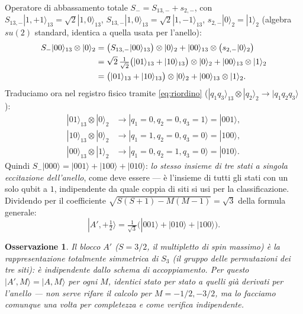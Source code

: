 \documentclass[11pt,a4paper]{article}
\newtheorem{osservazione}{Osservazione}
\begin{document}
Operatore di abbassamento totale $S_-=S_{13,-}+s_{2,-}$, con
$S_{13,-}|1,{+}1\rangle_{13}=\sqrt2|1,0\rangle_{13}$,
$S_{13,-}|1,0\rangle_{13}=\sqrt2|1,{-}1\rangle_{13}$, $s_{2,-}|0\rangle_2=|1\rangle_2$
(algebra $su(2)$ standard, identica a quella usata per l'anello):
\begin{align}
S_-|00\rangle_{13}\otimes|0\rangle_2
&= \big(S_{13,-}|00\rangle_{13}\big)\otimes|0\rangle_2 + |00\rangle_{13}\otimes\big(s_{2,-}|0\rangle_2\big)\notag\\
&= \sqrt2\,\tfrac1{\sqrt2}\big(|01\rangle_{13}+|10\rangle_{13}\big)\otimes|0\rangle_2 + |00\rangle_{13}\otimes|1\rangle_2\notag\\
&= \big(|01\rangle_{13}+|10\rangle_{13}\big)\otimes|0\rangle_2 + |00\rangle_{13}\otimes|1\rangle_2 .
\end{align}
Traduciamo ora nel registro fisico tramite \eqref{eq:riordino} ($|q_1q_3\rangle_{13}\otimes|q_2\rangle_2\to|q_1q_2q_3\rangle$):
\begin{align}
|01\rangle_{13}\otimes|0\rangle_2 &\to |q_1{=}0,q_2{=}0,q_3{=}1\rangle = |001\rangle,\\
|10\rangle_{13}\otimes|0\rangle_2 &\to |q_1{=}1,q_2{=}0,q_3{=}0\rangle = |100\rangle,\\
|00\rangle_{13}\otimes|1\rangle_2 &\to |q_1{=}0,q_2{=}1,q_3{=}0\rangle = |010\rangle.
\end{align}
Quindi $S_-|000\rangle = |001\rangle+|100\rangle+|010\rangle$: \emph{lo stesso
insieme di tre stati a singola eccitazione dell'anello}, come deve essere —
è l'insieme di tutti gli stati con un solo qubit a $1$, indipendente da
quale coppia di siti si usi per la classificazione. Dividendo per il
coefficiente $\sqrt{S(S{+}1)-M(M{-}1)}=\sqrt3$ della formula generale:
\begin{equation}
|A',{+}\tfrac12\rangle = \tfrac1{\sqrt3}\big(|001\rangle+|010\rangle+|100\rangle\big).
\label{eq:Ap12}
\end{equation}

\begin{osservazione}
Il blocco $A'$ ($S=3/2$, il multipletto di spin massimo) è la rappresentazione
totalmente simmetrica di $S_3$ (il gruppo delle permutazioni dei tre siti):
è \emph{indipendente dallo schema di accoppiamento}. Per questo
$|A',M\rangle=|A,M\rangle$ per ogni $M$, identici stato per stato a quelli
già derivati per l'anello — non serve rifare il calcolo per $M=-1/2,-3/2$,
ma lo facciamo comunque una volta per completezza e come verifica indipendente.
\end{osservazione}
\end{document}

